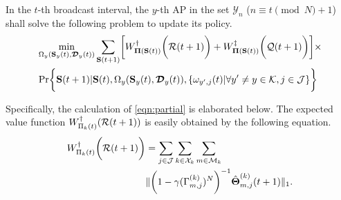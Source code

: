 \begin{problem}
    In the $t$-th broadcast interval, the $y$-th AP in the set $\mathcal{Y}_{n}$ ($n \equiv t \pmod{N} + 1$) shall solve the following problem to update its policy.
    {\tiny
    \begin{align}
        &\min_{ \Omega_{y}(\Stat_{y}(t), \Delay_{y}(t)) }
        \sum_{\Stat(t+1)} \Bracket{
            W^{\dagger}_{\Baseline(\Stat(t))} \Paren{\mathcal{R}(t+1)} + W^{\ddagger}_{\Baseline(\Stat(t))}\Paren{\mathcal{Q}(t+1)}
        } \times
        \nonumber\\
        &\Pr\Brace{
            \Stat(t+1) | \Stat(t), \Omega_{y}(\Stat_{y}(t), \Delay_{y}(t)), \set{\omega_{y',j}(t)|\forall y' \neq y \in\apSet, j\in\jSpace}
        }
    \end{align}
    }
    \label{problem_2}
\end{problem}


Specifically, the calculation of \ref{eqn:partial} is elaborated below.
The expected value function $W^{\dagger}_{\Pi_{k}(t)}(\mathcal{R}(t+1))$ is easily obtained by the following equation.
\begin{align}
    W^{\dagger}_{\Pi_{k}(t)}\bigg(\mathcal{R}(t+1)\bigg) &= \sum_{j\in\mathcal{J}}\sum_{k\in\mathcal{X}_{k}}\sum_{m\in\mathcal{M}_{k}}
    \nonumber\\
    &\lVert
        \bigg( 1 - \gamma ({\Gamma}^{(k)}_{m,j})^{N} \bigg)^{-1} \hat{\boldsymbol{\Theta}}^{(k)}_{m,j}(t+1)
    \|_1.
    \label{w_ap}
\end{align}


